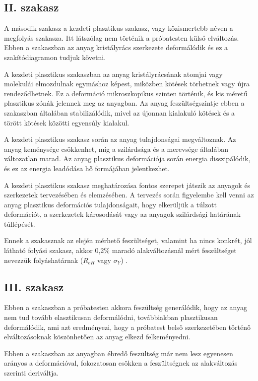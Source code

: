 \documentclass[12pt,a4paper,oneside]{report}
\begin{document}
\subsection{II. szakasz}
A második szakasz a kezdeti plasztikus szakasz, vagy közismertebb néven a megfolyás szakasza. Itt látszólag nem történik a próbatesten külső elváltozás. Ebben a szakaszban az anyag kristályrács szerkezete deformálódik és ez a szakítódiagramon tudjuk követni.

A kezdeti plasztikus szakaszban az anyag kristályrácsának atomjai vagy molekulái elmozdulnak egymáshoz képest, miközben kötések törhetnek vagy újra rendeződhetnek. Ez a deformáció mikroszkopikus szinten történik, és kis méretű plasztikus zónák jelennek meg az anyagban. Az anyag feszültségszintje ebben a szakaszban általában stabilizálódik, mivel az újonnan kialakuló kötések és a törött kötések közötti egyensúly kialakul.

A kezdeti plasztikus szakasz során az anyag tulajdonságai megváltoznak. Az anyag keménysége csökkenhet, míg a szilárdsága és a merevsége általában változatlan marad. Az anyag plasztikus deformációja során energia disszipálódik, és ez az energia leadódása hő formájában jelentkezhet.

A kezdeti plasztikus szakasz meghatározása fontos szerepet játszik az anyagok és szerkezetek tervezésében és elemzésében. A tervezés során figyelembe kell venni az anyag plasztikus deformációs tulajdonságait, hogy elkerüljük a túlzott deformációt, a szerkezetek károsodását vagy az anyagok szilárdsági határának túllépését.

Ennek a szakasznak az elején mérhető feszültséget, valamint ha nincs konkrét, jól látható folyási szakasz, akkor 0,2\% maradó alakváltozásnál mért feszültséget nevezzük folyáshatárnak ($R_{eH}$ vagy $\sigma_Y$) \cite{pek2015anyag}.

\subsection{III. szakasz}
Ebben a szakaszban a próbatesten akkora feszültség generálódik, hogy az anyag nem tud tovább elasztikusan deformálódni, továbbiakban plasztikusan deformálódik, ami azt eredményezi, hogy a próbatest belső szerkezetében történő elváltozásoknak köszönhetően az anyag elkezd felkeményedni.

Ebben a szakaszban az anyagban ébredő feszültség már nem lesz egyenesen arányos a deformációval, fokozatosan csökken a feszültségnek az alakváltozás szerinti deriváltja.
\end{document}
